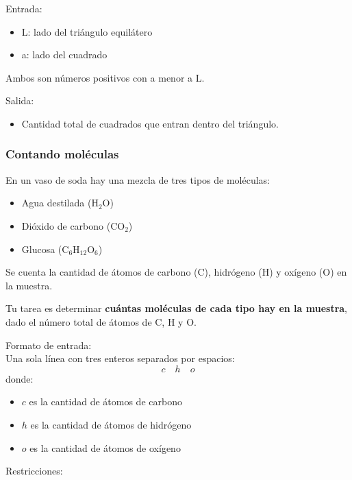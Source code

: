 Entrada:

\begin{itemize}
  \item L: lado del triángulo equilátero
  \item a: lado del cuadrado
\end{itemize}

Ambos son números positivos con a menor a L.

Salida:

\begin{itemize}
  \item Cantidad total de cuadrados que entran dentro del triángulo.
\end{itemize}

{\small
  \lstset{inputencoding=utf8/latin1}
  
}

\subsubsection{Contando moléculas}

En un vaso de soda hay una mezcla de tres tipos de moléculas:
\begin{itemize}
    \item Agua destilada (H$_2$O)
    \item Dióxido de carbono (CO$_2$)
    \item Glucosa (C$_6$H$_{12}$O$_6$)
\end{itemize}

Se cuenta la cantidad de átomos de carbono (C), hidrógeno (H) y oxígeno (O) en la muestra.

Tu tarea es determinar \textbf{cuántas moléculas de cada tipo hay en la muestra}, dado el número total de átomos de C, H y O.

Formato de entrada:\\

Una sola línea con tres enteros separados por espacios:
\[
c \quad h \quad o
\]
donde:
\begin{itemize}
    \item $c$ es la cantidad de átomos de carbono
    \item $h$ es la cantidad de átomos de hidrógeno
    \item $o$ es la cantidad de átomos de oxígeno
\end{itemize}

Restricciones:\\

